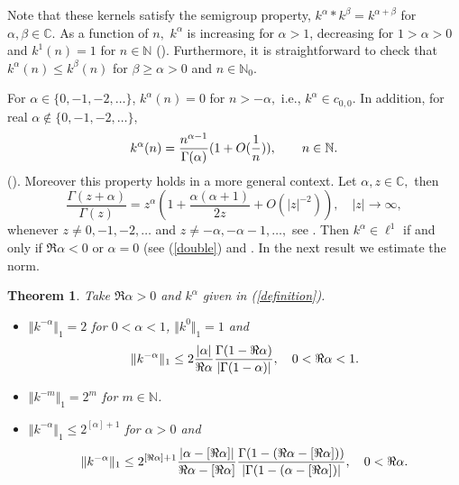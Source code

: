 \documentclass[a4paper,12pt]{amsart}
\def\N{\mathbb N}
\def\NN{\mathbb N}
\def\CC{\mathbb C}
\def\CC{\mathbb C}
\newtheorem{theorem}[thm]{Theorem}
\theoremstyle{definition}
\theoremstyle{remark}
\begin{document}
 Note that these kernels satisfy the semigroup property, $k^{\alpha}*k^{\beta}=k^{\alpha+\beta}$ for $\alpha, \beta \in \CC$. As a function of $n,$ $k^\alpha$ is increasing  for $\alpha >1$, decreasing for $1>\alpha >0$ and $k^1(n)=1$ for $n\in \N$ (\cite[Theorem III.1.17]{Zygmund}). Furthermore, it is straightforward to check that  $k^\alpha(n)\le k^\beta(n)$ for $\beta \ge \alpha>0$ and $n\in \N_0$.


For $\alpha\in\{0,-1,-2,\ldots\}$, $k^{\alpha}(n)=0$ for $n> -\alpha,$ i.e., $k^\alpha\in c_{0,0}$. In addition, for real $\alpha\notin\{0,-1,-2,\ldots\},$   \begin{equation}\label{double}
 k^{\alpha}(n)=\frac{n^{\alpha-1}}{\Gamma(\alpha)}(1+O({1\over n})), \qquad n\in \N. \end{equation}
(\cite[Vol. I, p.77 (1.18)]{Zygmund}). Moreover this property holds in a more general context. Let $\alpha,z\in\CC,$ then \begin{equation}\label{jiji}
    \frac{\Gamma(z+\alpha)}{\Gamma(z)}=z^{\alpha}(1+\frac{\alpha(\alpha+1)}{2z}+O(|z|^{-2})),\quad |z|\to\infty,\end{equation}
    whenever $z\neq 0,-1,-2,\ldots$ and $z\neq -\alpha,-\alpha-1,\ldots,$ see \cite{ET}. Then $k^\alpha\in \ell^1$ if and only if $\Re \alpha <0$ or $\alpha=0$ (see (\ref{double}) and \cite[Lemma 5.3(i)]{AM2018}. In the next result we estimate the norm.

\begin{theorem}\label{keys} Take $\Re\alpha >0$ and $k^\alpha$ given in (\ref{definition}).
\begin{itemize}
    \item [(i)] $\Vert k^{-\alpha}\Vert_1=2$ for $0<\alpha<1$, $\Vert k^0\Vert_1=1$ and $$
     \Vert k^{-\alpha}\Vert_1\le2{\vert \alpha\vert\over \Re\alpha}{\Gamma(1-\Re\alpha)\over \vert\Gamma(1-\alpha)\vert}, \quad  0<\Re\alpha<1.$$
     \item [(ii)]  $\Vert k^{-m}\Vert_1= 2^m$ for $m\in \NN$.
     \item [(iii)]  $\Vert k^{-\alpha}\Vert_1\le 2^{ [\alpha]+1}$ for $\alpha >0$ and
     $$
     \Vert k^{-\alpha}\Vert_1\le 2^{[\Re \alpha]+1}{\vert \alpha-[\Re\alpha]\vert\over \Re\alpha-[\Re \alpha]}{\Gamma(1-(\Re\alpha-[\Re \alpha]))\over \vert\Gamma(1-(\alpha-[\Re\alpha])\vert}, \quad  0<\Re\alpha.
     $$
\end{itemize}
\end{theorem}
\end{document}
